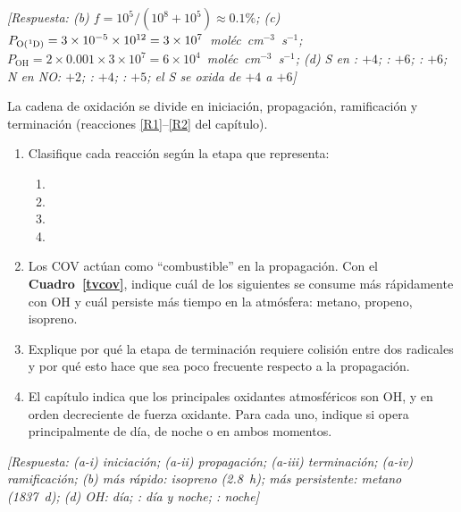 \begin{bloque_ejercicios}
\begin{ejercicios}
\textit{[Respuesta:
(b) $f = 10^5/(10^8+10^5) \approx 0.1\%$;
(c) $P_{\ce{O(^1D)}} = 3\times10^{-5}\times10^{12}
    = 3\times10^7$~mol\'ec~cm$^{-3}$~s$^{-1}$;
    $P_\mathrm{OH} = 2\times0.001\times3\times10^7
    = 6\times10^4$~mol\'ec~cm$^{-3}$~s$^{-1}$;
(d) S en : $+4$; : $+6$; : $+6$;
    N en NO: $+2$; : $+4$; : $+5$;
    el S se oxida de $+4$ a $+6$]}

\item La cadena de oxidaci\'on se divide en iniciaci\'on,
propagaci\'on, ramificaci\'on y terminaci\'on
(reacciones \ref{R1}--\ref{R2} del cap\'itulo).

\begin{enumerate}[label=\alph*)]
    \item Clasifique cada reacci\'on seg\'un la etapa
          que representa:
          \begin{enumerate}[label=\roman*)]
              \item {}
              \item {}
              \item {}
              \item {}
          \end{enumerate}

    \item Los COV act\'uan como ``combustible'' en la
          propagaci\'on. Con el \textbf{Cuadro~\ref{tvcov}},
          indique cu\'al de los siguientes se consume m\'as
          r\'apidamente con OH y cu\'al persiste m\'as tiempo
          en la atm\'osfera: metano, propeno, isopreno.

    \item Explique por qu\'e la etapa de terminaci\'on
          requiere colisi\'on entre dos radicales y por qu\'e
          esto hace que sea poco frecuente respecto
          a la propagaci\'on.

    \item El cap\'itulo indica que los principales oxidantes
          atmosf\'ericos son OH,  y 
          en orden decreciente de fuerza oxidante.
          Para cada uno, indique si opera principalmente
          de d\'ia, de noche o en ambos momentos.
\end{enumerate}

\textit{[Respuesta:
(a-i) iniciaci\'on; (a-ii) propagaci\'on;
      (a-iii) terminaci\'on; (a-iv) ramificaci\'on;
(b) m\'as r\'apido: isopreno (2.8~h);
    m\'as persistente: metano (1837~d);
(d) OH: d\'ia; : d\'ia y noche; : noche]}


\end{ejercicios}
\end{bloque_ejercicios}
